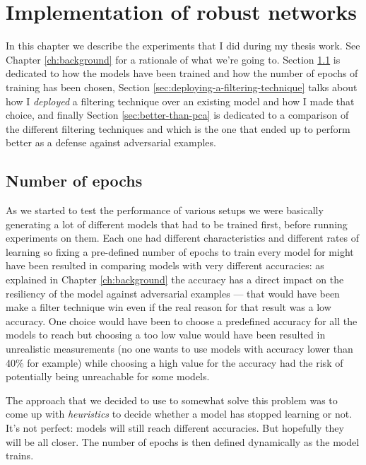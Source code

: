 \chapter{Implementation of robust networks}
\label{ch:implementation-of-robust-networks}

In this chapter we describe the experiments that I did during my thesis
work. See Chapter \ref{ch:background} for a rationale of what we're
going to. Section \ref{sec:number-of-epochs}
is dedicated to how the models have been trained and how the number of
epochs of training has been chosen, Section
\ref{sec:deploying-a-filtering-technique} talks about how I
\emph{deployed} a filtering technique over an existing model and how I
made that choice, and finally Section \ref{sec:better-than-pca} is
dedicated to a comparison of the different filtering techniques and
which is the one that ended up to perform better as a defense against
adversarial examples.

\section{Number of epochs}
\label{sec:number-of-epochs}

As we started to test the performance of various setups we were
basically generating a lot of different models that had to be trained
first, before running experiments on them. Each one had different
characteristics and different rates of learning so fixing a pre-defined
number of epochs to train every model for might have been resulted in
comparing models with very different accuracies: as explained in
Chapter \ref{ch:background} the accuracy has a direct impact on the
resiliency of the model against adversarial examples --- that would
have been make a filter technique win even if the real reason for that
result was a low accuracy. One choice would have been to choose a
predefined accuracy for all the models to reach but choosing a too low
value would have been resulted in unrealistic measurements (no one
wants to use models with accuracy lower than 40\% for example) while
choosing a high value for the accuracy had the risk of potentially
being unreachable for some models.

The approach that we decided to use to somewhat solve this problem was
to come up with \emph{heuristics} to decide whether a model has
stopped learning or not. It's not perfect: models will still reach
different accuracies. But hopefully they will be all closer. The number
of epochs is then defined dynamically as the model trains.

